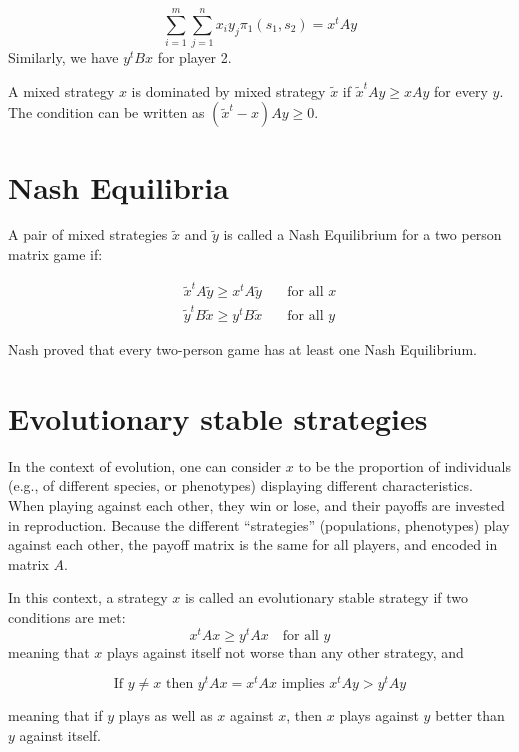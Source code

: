 \documentclass[]{book}
\begin{document}
\[
\sum_{i=1}^m \sum_{j = 1}^n x_i y_j \pi_1 (s_1, s_2) = x^t A y
\]
Similarly, we have \(y^t B x\) for player 2.

A mixed strategy \(x\) is dominated by mixed strategy \(\tilde{x}\) if \(\tilde{x}^t A y \geq x A y\) for every \(y\). The condition can be written as \((\tilde{x}^t - x) A y \geq 0\).

\hypertarget{nash-equilibria}{%
\section{Nash Equilibria}\label{nash-equilibria}}

A pair of mixed strategies \(\tilde{x}\) and \(\tilde{y}\) is called a Nash Equilibrium for a two person matrix game if:

\[
\begin{aligned}
\tilde{x}^t A \tilde{y} \geq x^t A \tilde{y} &\quad \text{for all } x\\
\tilde{y}^t B \tilde{x} \geq y^t B \tilde{x} &\quad \text{for all } y
\end{aligned}
\]

Nash proved that every two-person game has at least one Nash Equilibrium.

\hypertarget{evolutionary-stable-strategies}{%
\section{Evolutionary stable strategies}\label{evolutionary-stable-strategies}}

In the context of evolution, one can consider \(x\) to be the proportion of individuals (e.g., of different species, or phenotypes) displaying different characteristics. When playing against each other, they win or lose, and their payoffs are invested in reproduction. Because the different ``strategies'' (populations, phenotypes) play against each other, the payoff matrix is the same for all players, and encoded in matrix \(A\).

In this context, a strategy \(x\) is called an evolutionary stable strategy if two conditions are met:
\[
x^t A x \geq y^t A x \quad \text{for all } y
\]
meaning that \(x\) plays against itself not worse than any other strategy, and

\[
\text{If } y \neq x \text{ then } y^t A x = x^t A x \text{ implies } x^t A y > y^t A y
\]

meaning that if \(y\) plays as well as \(x\) against \(x\), then \(x\) plays against \(y\) better than \(y\) against itself.
\end{document}
